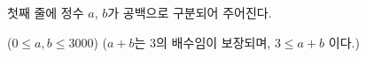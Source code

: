 첫째 줄에 정수 $a$, $b$가 공백으로 구분되어 주어진다.

($0 \le a, b \le 3000$) ($a + b$는 $3$의 배수임이 보장되며, $3 \le a + b$ 이다.)